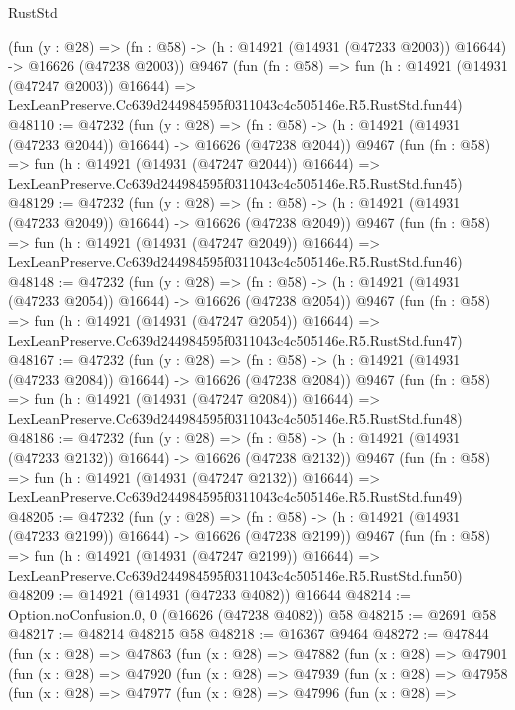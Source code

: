 \begin{lexlean}{RustStd}
\begin{coremodule}
    (fun (y : @28) =>
    (fn : @58) -> (h : @14921 (@14931 (@47233 @2003)) @16644) -> @16626 (@47238 @2003))
    @9467
    (fun (fn : @58) =>
    fun (h : @14921 (@14931 (@47247 @2003)) @16644) =>
    LexLeanPreserve.Cc639d244984595f0311043c4c505146e.R5.RustStd.fun44)
@48110 := @47232
    (fun (y : @28) =>
    (fn : @58) -> (h : @14921 (@14931 (@47233 @2044)) @16644) -> @16626 (@47238 @2044))
    @9467
    (fun (fn : @58) =>
    fun (h : @14921 (@14931 (@47247 @2044)) @16644) =>
    LexLeanPreserve.Cc639d244984595f0311043c4c505146e.R5.RustStd.fun45)
@48129 := @47232
    (fun (y : @28) =>
    (fn : @58) -> (h : @14921 (@14931 (@47233 @2049)) @16644) -> @16626 (@47238 @2049))
    @9467
    (fun (fn : @58) =>
    fun (h : @14921 (@14931 (@47247 @2049)) @16644) =>
    LexLeanPreserve.Cc639d244984595f0311043c4c505146e.R5.RustStd.fun46)
@48148 := @47232
    (fun (y : @28) =>
    (fn : @58) -> (h : @14921 (@14931 (@47233 @2054)) @16644) -> @16626 (@47238 @2054))
    @9467
    (fun (fn : @58) =>
    fun (h : @14921 (@14931 (@47247 @2054)) @16644) =>
    LexLeanPreserve.Cc639d244984595f0311043c4c505146e.R5.RustStd.fun47)
@48167 := @47232
    (fun (y : @28) =>
    (fn : @58) -> (h : @14921 (@14931 (@47233 @2084)) @16644) -> @16626 (@47238 @2084))
    @9467
    (fun (fn : @58) =>
    fun (h : @14921 (@14931 (@47247 @2084)) @16644) =>
    LexLeanPreserve.Cc639d244984595f0311043c4c505146e.R5.RustStd.fun48)
@48186 := @47232
    (fun (y : @28) =>
    (fn : @58) -> (h : @14921 (@14931 (@47233 @2132)) @16644) -> @16626 (@47238 @2132))
    @9467
    (fun (fn : @58) =>
    fun (h : @14921 (@14931 (@47247 @2132)) @16644) =>
    LexLeanPreserve.Cc639d244984595f0311043c4c505146e.R5.RustStd.fun49)
@48205 := @47232
    (fun (y : @28) =>
    (fn : @58) -> (h : @14921 (@14931 (@47233 @2199)) @16644) -> @16626 (@47238 @2199))
    @9467
    (fun (fn : @58) =>
    fun (h : @14921 (@14931 (@47247 @2199)) @16644) =>
    LexLeanPreserve.Cc639d244984595f0311043c4c505146e.R5.RustStd.fun50)
@48209 := @14921 (@14931 (@47233 @4082)) @16644
@48214 := Option.noConfusion.{0, 0} (@16626 (@47238 @4082)) @58
@48215 := @2691 @58
@48217 := @48214 @48215 @58
@48218 := @16367 @9464
@48272 := @47844
    (fun (x : @28) =>
    @47863
      (fun (x : @28) =>
      @47882
        (fun (x : @28) =>
        @47901
          (fun (x : @28) =>
          @47920
            (fun (x : @28) =>
            @47939
              (fun (x : @28) =>
              @47958
                (fun (x : @28) =>
                @47977
                  (fun (x : @28) =>
                  @47996
                    (fun (x : @28) =>

\end{coremodule}
\end{lexlean}
